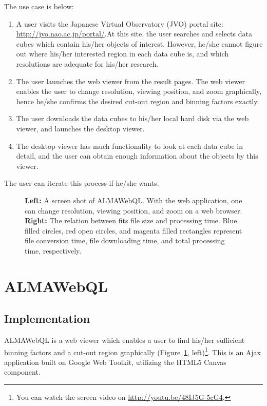 The use case is below:
\begin{enumerate}
	\item A user visits the Japanese Virtual Observatory (JVO) portal site: \url{http://jvo.nao.ac.jp/portal/}.At this site, the user searches and selects data cubes which contain his/her objects of interest. However, he/she cannot figure out where his/her interested region in each data cube is, and which resolutions are adequate for his/her research.
	
	\item The user launches the web viewer from the result pages. The web viewer enables the user to change resolution, viewing position, and zoom graphically, hence he/she confirms the desired cut-out region and binning factors exactly.
	
	\item The user downloads the data cubes to his/her local hard disk via the web viewer, and launches the desktop viewer.
	
	\item The desktop viewer has much functionality to look at each data cube in detail, and the user can obtain enough information about the objects by this viewer.
\end{enumerate}
The user can iterate this process if he/she wants.


\begin{figure}
	\caption{{\bf Left:} A screen shot of ALMAWebQL. With the web application, one can change resolution, viewing position, and zoom on a web browser. {\bf Right:} The relation between fits file size and processing time. Blue filled circles, red open circles, and magenta filled rectangles represent file conversion time, file downloading time, and total processing time, respectively.\label{O10_f2}}
\end{figure}


\section{ALMAWebQL}


\subsection{Implementation}

ALMAWebQL is a web viewer which enables a user to find his/her sufficient binning factors and a cut-out region graphically (Figure~\ref{O10_f2}, left)\footnote{You can watch the screen video on \url{http://youtu.be/48IJ5G-5cG4}.}. This is an Ajax application built on Google Web Toolkit, utilizing the HTML5 Canvas component.

